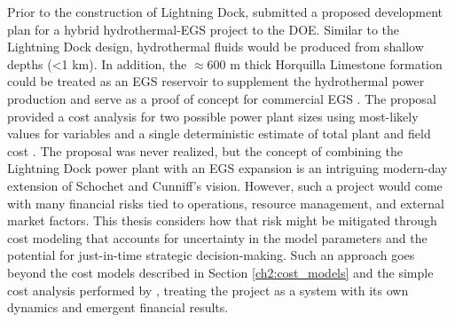 Prior to the construction of Lightning Dock, \citet{schochet_development_2001} submitted a proposed development plan for a hybrid hydrothermal-EGS project to the DOE. Similar to the Lightning Dock design, hydrothermal fluids would be produced from shallow depths (<1 km). In addition, the $\approx$600 m thick Horquilla Limestone formation could be treated as an EGS reservoir to supplement the hydrothermal power production and serve as a proof of concept for commercial EGS \citep{schochet_development_2001}. The proposal provided a cost analysis for two possible power plant sizes using most-likely values for variables and a single deterministic estimate of total plant and field cost \citep[Table 3,][]{schochet_development_2001}. The proposal was never realized, but the concept of combining the Lightning Dock power plant with an EGS expansion is an intriguing modern-day extension of Schochet and Cunniff’s vision. However, such a project would come with many financial risks tied to operations, resource management, and external market factors. This thesis considers how that risk might be mitigated through cost modeling that accounts for uncertainty in the model parameters and the potential for just-in-time strategic decision-making. Such an approach goes beyond the cost models described in Section \ref{ch2:cost_models} and the simple cost analysis performed by \citet{schochet_development_2001}, treating the project as a system with its own dynamics and emergent financial results.

